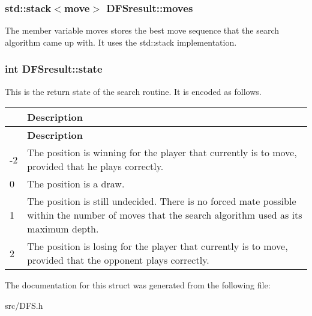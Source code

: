 \subsubsection[{\texorpdfstring{moves}{moves}}]{\setlength{\rightskip}{0pt plus 5cm}std\+::stack$<${\bf move}$>$ D\+F\+Sresult\+::moves}\hypertarget{structDFSresult_acbab901f87df79e0ff718f4fd9435a0f}{}\label{structDFSresult_acbab901f87df79e0ff718f4fd9435a0f}
The member variable moves stores the best move sequence that the search algorithm came up with. It uses the std\+::stack implementation. 
\subsubsection[{\texorpdfstring{state}{state}}]{\setlength{\rightskip}{0pt plus 5cm}int D\+F\+Sresult\+::state}\hypertarget{structDFSresult_a05517437c3e1db1f5b212f2862801b85}{}\label{structDFSresult_a05517437c3e1db1f5b212f2862801b85}
This is the return state of the search routine. It is encoded as follows. \tabulinesep=1mm
\begin{longtabu} spread 0pt [c]{*2{|X[-1]}|}
\hline
{}&{\bf Description  }\\
\endfirsthead
\hline
\endfoot
\hline
{}&{\bf Description  }\\
\endhead
-\/2 &The position is winning for the player that currently is to move, provided that he plays correctly. \\
0 &The position is a draw. \\
1 &The position is still undecided. There is no forced mate possible within the number of moves that the search algorithm used as its maximum depth. \\
2 &The position is losing for the player that currently is to move, provided that the opponent plays correctly. \\
\end{longtabu}


The documentation for this struct was generated from the following file\+:\begin{DoxyCompactItemize}
\item 
src/D\+F\+S.\+h\end{DoxyCompactItemize}
